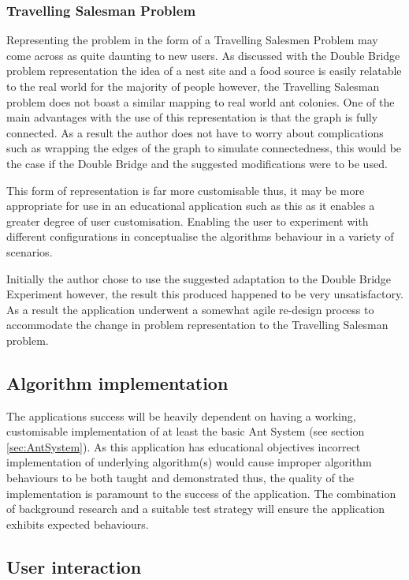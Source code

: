 \subsubsection{Travelling Salesman Problem}

Representing the problem in the form of a Travelling Salesmen Problem may come across as quite daunting to new users. As discussed with the Double Bridge problem representation the idea of a nest site and a food source is easily relatable to the real world for the majority of people however, the Travelling Salesman problem does not boast a similar mapping to real world ant colonies. One of the main advantages with the use of this representation is that the graph is fully connected. As a result the author does not have to worry about complications such as wrapping the edges of the graph to simulate connectedness, this would be the case if the Double Bridge and the suggested modifications were to be used.

This form of representation is far more customisable thus, it may be more appropriate for use in an educational application such as this as it enables a greater degree of user customisation. Enabling the user to experiment with different configurations in conceptualise the algorithms behaviour in a variety of scenarios.

Initially the author chose to use the suggested adaptation to the Double Bridge Experiment however, the result this produced happened to be very unsatisfactory. As a result the application underwent a somewhat agile re-design process to accommodate the change in problem representation to the Travelling Salesman problem.

\subsection{Algorithm implementation}

The applications success will be heavily dependent on having a working, customisable implementation of at least the basic Ant System (see section \ref{sec:AntSystem}). As this application has educational objectives incorrect implementation of underlying algorithm(s) would cause improper algorithm behaviours to be both taught and demonstrated thus, the quality of the implementation is paramount to the success of the application. The combination of background research and a suitable test strategy will ensure the application exhibits expected behaviours.

\subsection{User interaction}

